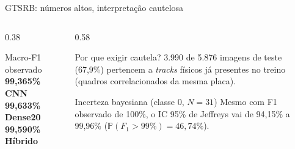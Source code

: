 \documentclass[aspectratio=169,11pt,brazil]{beamer}
\begin{document}
\begin{frame}{GTSRB: números altos, interpretação cautelosa}
  \begin{columns}[T,onlytextwidth]
    \begin{column}{0.38\textwidth}
      \begin{block}{Macro-F1 observado}
        \centering\vspace{0.35cm}
        {\large\bfseries\color{senacblue}99,365\% \; CNN}\\[10pt]
        {\large\bfseries\color{senacblue}99,633\% \; Dense20}\\[10pt]
        {\large\bfseries\color{senacblue}99,590\% \; Híbrido}
        \vspace{0.35cm}
      \end{block}
    \end{column}
    \begin{column}{0.58\textwidth}
      \begin{alertblock}{Por que exigir cautela?}
        3.990 de 5.876 imagens de teste (67,9\%) pertencem a \textit{tracks} físicos já presentes no treino (quadros correlacionados da mesma placa).
      \end{alertblock}
      \vspace{0.15cm}
      \begin{block}{Incerteza bayesiana (classe 0, $N=31$)}
        Mesmo com F1 observado de 100\%, o IC 95\% de Jeffreys vai de 94,15\% a 99,96\% ($\mathbb{P}(F_1>99\%)=46{,}74\%$).
      \end{block}
    \end{column}
  \end{columns}
\end{frame}
\end{document}

